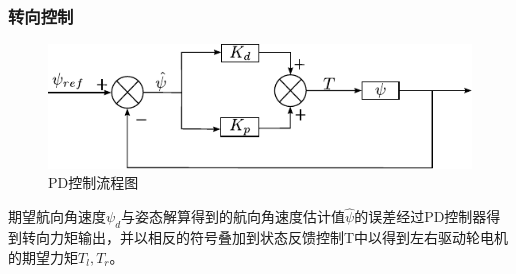 \documentclass{beamer}
\begin{document}
	
	\begin{frame}
		\frametitle{转向控制}
		\begin{figure}
			\centering
			\includegraphics[width=\linewidth]{img/chapter5/pd.pdf}
			\captionsetup{font=scriptsize}
			\vspace{5pt}
			\caption{PD控制流程图}
		\end{figure}
	期望航向角速度$\psi_d$与姿态解算得到的航向角速度估计值$\hat{\psi}$的误差经过PD控制器得到转向力矩输出，并以相反的符号叠加到状态反馈控制T中以得到左右驱动轮电机的期望力矩$T_l,T_r$。
	\end{frame}
	
\end{document}
